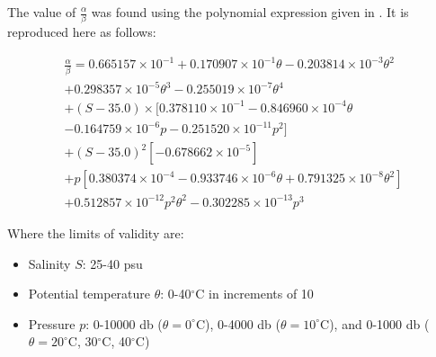 \label{appendix_b}
The value of $\frac{\alpha}{\beta}$ was found using the polynomial expression given in \citet{McDougall1987}. It is reproduced here as follows:

\begin{multline*}
    \frac{\alpha}{\beta} = 0.665157 \times 10^{-1} + 0.170907 \times 10^{-1}\theta 
    - 0.203814 \times 10^{-3}\theta^2 \\ + 0.298357  \times 10^{-5}\theta^3 
    - 0.255019 \times 10^{-7}\theta^4 \\
    + (S-35.0) \times [ 0.378110 \times 10^{-1} 
    -0.846960 \times 10^{-4}\theta \\
    -0.164759 \times 10^{-6}p - 0.251520 \times 10^{-11}p^2 ] \\
    +(S-35.0)^2 [ -0.678662 \times 10^{-5} ] \\
    +p [0.380374 \times 10^{-4} - 0.933746 \times 10^{-6}\theta 
    +0.791325 \times 10^{-8}\theta^2] \\
    +0.512857 \times 10^{-12}p^2\theta^2 - 0.302285 \times 10^{-13}p^3
\end{multline*}

Where the limits of validity are:

\begin{itemize}
    \item Salinity $S$: 25-40 psu
    \item Potential temperature $\theta$: 0-40$^{\circ}$C in increments of 10
    \item Pressure $p$: 0-10000 db ($\theta = 0^{\circ}$C), 0-4000 db ($\theta = 10^{\circ}$C), and 0-1000 db ($\theta = 20^{\circ}$C, 30$^{\circ}$C, 40$^{\circ}$C)
\end{itemize}